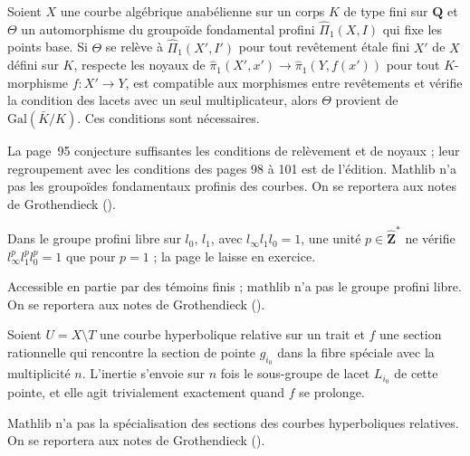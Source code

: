 \begin{encadre}
\begin{conjecture*}
Soient $X$ une courbe algébrique anabélienne sur un corps $K$ de type fini sur $\mathbf Q$ et $\Theta$ un automorphisme du groupoïde fondamental profini $\hat\Pi_1(X, I)$ qui fixe les points base. Si $\Theta$ se relève à $\hat\Pi_1(X', I')$ pour tout revêtement étale fini $X'$ de $X$ défini sur $K$, respecte les noyaux de $\hat\pi_1(X', x') \to \hat\pi_1(Y, f(x'))$ pour tout $K$-morphisme $f : X' \to Y$, est compatible aux morphismes entre revêtements et vérifie la condition des lacets avec un seul multiplicateur, alors $\Theta$ provient de $\mathrm{Gal}(\bar K/K)$. Ces conditions sont nécessaires.
\end{conjecture*}
\end{encadre}
{\small La page~95 conjecture suffisantes les conditions de relèvement et de noyaux ; leur regroupement avec les conditions des pages 98 à 101 est de l'édition. Mathlib n'a pas les groupoïdes fondamentaux profinis des courbes. On se reportera aux notes de Grothendieck ().\par}

\begin{encadre}
\begin{conjecture*}
Dans le groupe profini libre sur $l_0$, $l_1$, avec $l_\infty l_1 l_0 = 1$, une unité $p \in \hat{\mathbf Z}^*$ ne vérifie $l_\infty^p l_1^p l_0^p = 1$ que pour $p = 1$ ; la page le laisse en exercice.
\end{conjecture*}
\end{encadre}
{\small Accessible en partie par des témoins finis ; mathlib n'a pas le groupe profini libre. On se reportera aux notes de Grothendieck ().\par}

\begin{encadre}
\begin{conjecture*}
Soient $U = X \setminus T$ une courbe hyperbolique relative sur un trait et $f$ une section rationnelle qui rencontre la section de pointe $g_{i_0}$ dans la fibre spéciale avec la multiplicité $n$. L'inertie s'envoie sur $n$ fois le sous-groupe de lacet $L_{i_0}$ de cette pointe, et elle agit trivialement exactement quand $f$ se prolonge.
\end{conjecture*}
\end{encadre}
{\small Mathlib n'a pas la spécialisation des sections des courbes hyperboliques relatives. On se reportera aux notes de Grothendieck ().\par}
